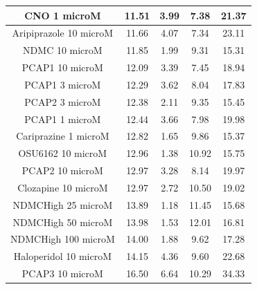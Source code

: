 \documentclass[a4paper,12pt]{article}
\begin{document}
\begin{table}[h!]
\begin{tabular}{|c|c|c|c|c|}
CNO 1 microM           & 11.51 & 3.99 & 7.38  & 21.37 \\ \hline
Aripiprazole 10 microM & 11.66 & 4.07 & 7.34  & 23.11 \\ \hline
NDMC 10 microM         & 11.85 & 1.99 & 9.31  & 15.31 \\ \hline
PCAP1 10 microM        & 12.09 & 3.39 & 7.45  & 18.94 \\ \hline
PCAP1 3 microM         & 12.29 & 3.62 & 8.04  & 17.83 \\ \hline
PCAP2 3 microM         & 12.38 & 2.11 & 9.35  & 15.45 \\ \hline
PCAP1 1 microM         & 12.44 & 3.66 & 7.98  & 19.98 \\ \hline
Cariprazine 1 microM   & 12.82 & 1.65 & 9.86  & 15.37 \\ \hline
OSU6162 10 microM      & 12.96 & 1.38 & 10.92 & 15.75 \\ \hline
PCAP2 10 microM        & 12.97 & 3.28 & 8.14  & 19.97 \\ \hline
Clozapine 10 microM    & 12.97 & 2.72 & 10.50  & 19.02 \\ \hline
NDMCHigh 25 microM     & 13.89 & 1.18 & 11.45 & 15.68 \\ \hline
NDMCHigh 50 microM     & 13.98 & 1.53 & 12.01 & 16.81 \\ \hline
NDMCHigh 100 microM    & 14.00    & 1.88 & 9.62  & 17.28 \\ \hline
Haloperidol 10 microM  & 14.15 & 4.36 & 9.60   & 22.68 \\ \hline
PCAP3 10 microM      & 16.50  & 6.64 & 10.29 & 34.33 \\ \hline
\end{tabular}
\end{table}
\newpage
\end{document}
